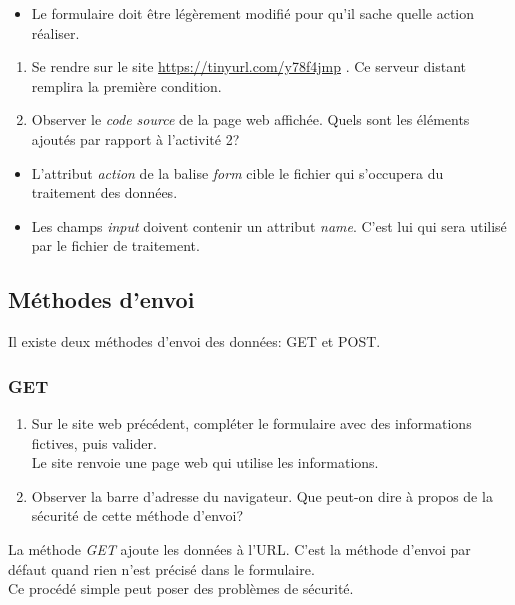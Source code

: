 \documentclass[a4paper,11pt]{article}
\begin{document}
\begin{Form}
\begin{itemize}
\item Le formulaire doit être légèrement modifié pour qu'il sache quelle action réaliser.
\end{itemize} 
\begin{activite}
\begin{enumerate}
\item Se rendre sur le site \url{https://tinyurl.com/y78f4jmp} . Ce serveur distant remplira la première condition.
\item Observer le \emph{code source} de la page web affichée. Quels sont les éléments ajoutés par rapport à l'activité 2?
\end{enumerate}
\end{activite}
\begin{aretenir}[]
\begin{itemize}
\item L'attribut \emph{action} de la balise \emph{form} cible le fichier qui s'occupera du traitement des données. 
\item Les champs \emph{input} doivent contenir un attribut \emph{name}. C'est lui qui sera utilisé par le fichier de traitement.
\end{itemize}
\end{aretenir}
\subsection{Méthodes d'envoi}
Il existe deux méthodes d'envoi des données: GET et POST.
\subsubsection{GET}
\begin{activite}
\begin{enumerate}
\item Sur le site web précédent, compléter le formulaire avec des informations fictives, puis valider.\\
Le site renvoie une page web qui utilise les informations.
\item Observer la barre d'adresse du navigateur. Que peut-on dire à propos de la sécurité de cette méthode d'envoi?
\end{enumerate}
\end{activite}
\begin{aretenir}[]
La méthode \emph{GET} ajoute les données à l'URL. C'est la méthode d'envoi par défaut quand rien n'est précisé dans le formulaire.\\ Ce procédé simple peut poser des problèmes de sécurité. 
\end{aretenir}

\end{Form}
\end{document}
